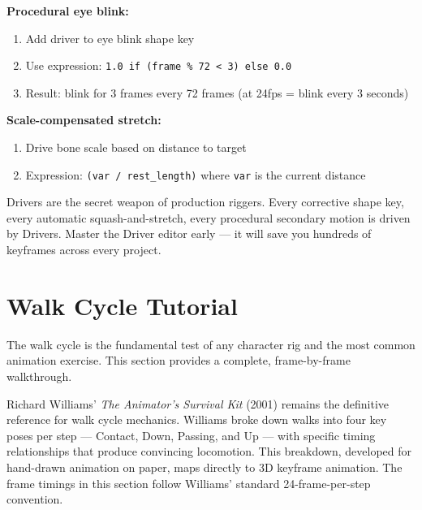 \textbf{Procedural eye blink:}
\begin{enumerate}[leftmargin=2em]
  \item Add driver to eye blink shape key
  \item Use expression: \texttt{1.0 if (frame \% 72 < 3) else 0.0}
  \item Result: blink for 3 frames every 72 frames (at 24fps = blink every 3 seconds)
\end{enumerate}

\textbf{Scale-compensated stretch:}
\begin{enumerate}[leftmargin=2em]
  \item Drive bone scale based on distance to target
  \item Expression: \texttt{(var / rest\_length)} where \texttt{var} is the current distance
\end{enumerate}

\begin{tipbox}
Drivers are the secret weapon of production riggers. Every corrective shape key, every automatic squash-and-stretch, every procedural secondary motion is driven by Drivers. Master the Driver editor early --- it will save you hundreds of keyframes across every project.
\end{tipbox}


\section{Walk Cycle Tutorial}
\label{sec:walk-cycle}

The walk cycle is the fundamental test of any character rig and the most common animation exercise. This section provides a complete, frame-by-frame walkthrough.

\begin{historynote}
Richard Williams' \textit{The Animator's Survival Kit} (2001) remains the definitive reference for walk cycle mechanics. Williams broke down walks into four key poses per step --- Contact, Down, Passing, and Up --- with specific timing relationships that produce convincing locomotion. This breakdown, developed for hand-drawn animation on paper, maps directly to 3D keyframe animation. The frame timings in this section follow Williams' standard 24-frame-per-step convention.
\end{historynote}

